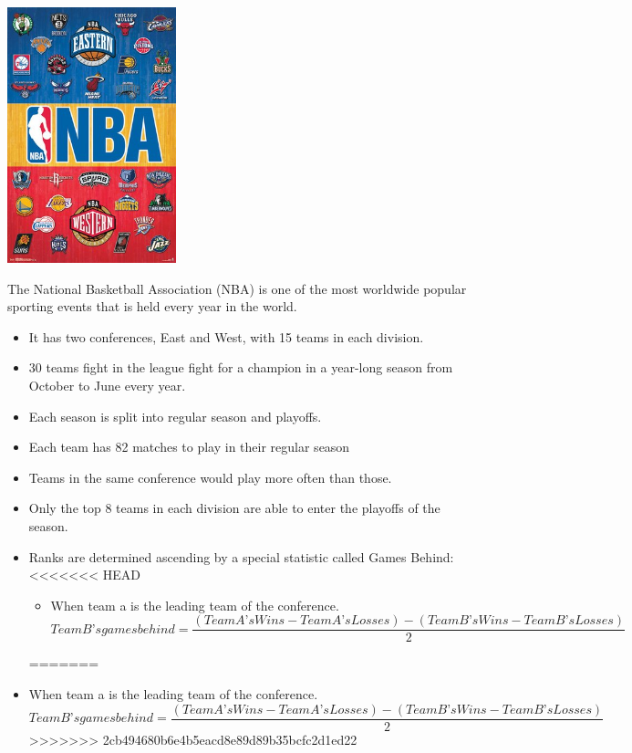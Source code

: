\documentclass[]{article}
\providecommand{\tightlist}{%
  \setlength{\itemsep}{0pt}\setlength{\parskip}{0pt}}
\begin{document}
\begin{center}\includegraphics[height=280px]{eastandwest} \end{center}

The National Basketball Association (NBA) is one of the most worldwide
popular sporting events that is held every year in the world.

\begin{itemize}
\tightlist
\item
  It has two conferences, East and West, with 15 teams in each division.
\item
  30 teams fight in the league fight for a champion in a year-long
  season from October to June every year.
\item
  Each season is split into regular season and playoffs.
\item
  Each team has 82 matches to play in their regular season
\item
  Teams in the same conference would play more often than those.
\item
  Only the top 8 teams in each division are able to enter the playoffs
  of the season.
\item
  Ranks are determined ascending by a special statistic called Games
  Behind:
<<<<<<< HEAD

  \begin{itemize}
  \tightlist
  \item
    When team a is the leading team of the conference.
    \[Team B’s games behind=\frac {(Team A’s Wins-Team A’s Losses)-(Team B’s Wins-Team B’s Losses)}{2}\]
  \end{itemize}
=======
\item
  When team a is the leading team of the conference.
  \[Team B’s games behind=\frac {(Team A’s Wins-Team A’s Losses)-(Team B’s Wins-Team B’s Losses)}{2}\]
>>>>>>> 2cb494680b6e4b5eacd8e89d89b35bcfc2d1ed22
\end{itemize}
\end{document}
